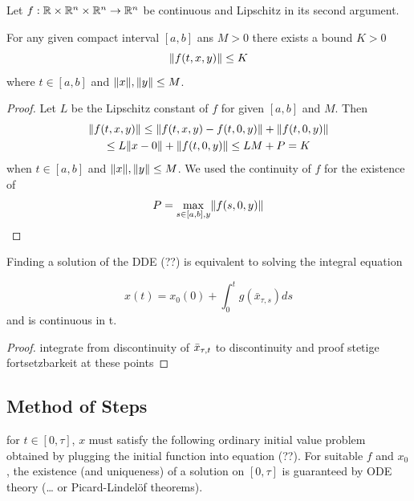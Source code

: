 \begin{lemma}
    \label{lemma-bounded-f}

    Let $f:\mathbb{R}\times\mathbb{R}^n\times\mathbb{R}^n\rightarrow\mathbb{R}^n$ be continuous and Lipschitz in its second argument.

    For any given compact interval $[a,b]$ ans $M>0$ there exists a bound $K>0$
    \begin{equation}
        \lVert f(t,x,y)\rVert\leq K
    \end{equation}
    where $t\in[a,b]$ and $\lVert x\rVert,\lVert y\rVert\leq M$.
\end{lemma}

\begin{proof}
    Let $L$ be the Lipschitz constant of $f$ for given $[a,b]$ and $M$. Then
    \begin{multline}
        \lVert f(t,x,y)\rVert \leq \lVert f(t,x,y) - f(t,0,y)\rVert + \lVert f(t,0,y)\rVert\\
        \leq L\lVert x-0\rVert + \lVert f(t,0,y)\rVert \leq LM+P = K
    \end{multline}
    when $t\in[a,b]$ and $\lVert x\rVert,\lVert y\rVert\leq M$. We used the continuity of $f$ for the existence of
    \begin{equation}
        P = \max_{s\in [a,b],y}\lVert f(s,0,y)\rVert
    \end{equation}
\end{proof}

\begin{lemma}
    \label{lemma-integral-equation}


    Finding a solution of the DDE (??) is equivalent to solving the integral equation

    \begin{equation}
        x(t) = x_0(0) + \int_0^t g(\bar{x}_{\tau,s})ds
    \end{equation}
    and is continuous in t.
\end{lemma}

\begin{proof}
integrate from discontinuity of $\bar{x}_{\tau,t}$ to discontinuity and proof stetige fortsetzbarkeit at these points
\end{proof}

\subsection{Method of Steps} \label{sec:method-of-steps}
for $t\in [0,\tau]$, $x$ must satisfy the following ordinary initial value problem obtained by plugging the initial function into equation (??). For suitable $f$ and $x_0$, the existence (and uniqueness) of a solution on $[0,\tau]$ is guaranteed by ODE theory (\ldots{} or Picard-Lindelöf theorems).

